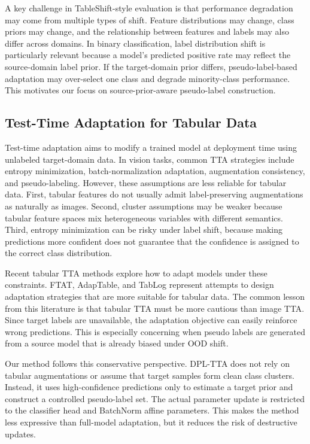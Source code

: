 A key challenge in TableShift-style evaluation is that performance degradation may come from multiple types of shift. Feature distributions may change, class priors may change, and the relationship between features and labels may also differ across domains. In binary classification, label distribution shift is particularly relevant because a model's predicted positive rate may reflect the source-domain label prior. If the target-domain prior differs, pseudo-label-based adaptation may over-select one class and degrade minority-class performance. This motivates our focus on source-prior-aware pseudo-label construction.

\subsection{Test-Time Adaptation for Tabular Data}

Test-time adaptation aims to modify a trained model at deployment time using unlabeled target-domain data. In vision tasks, common TTA strategies include entropy minimization, batch-normalization adaptation, augmentation consistency, and pseudo-labeling. However, these assumptions are less reliable for tabular data. First, tabular features do not usually admit label-preserving augmentations as naturally as images. Second, cluster assumptions may be weaker because tabular feature spaces mix heterogeneous variables with different semantics. Third, entropy minimization can be risky under label shift, because making predictions more confident does not guarantee that the confidence is assigned to the correct class distribution.

Recent tabular TTA methods explore how to adapt models under these constraints. FTAT, AdapTable, and TabLog represent attempts to design adaptation strategies that are more suitable for tabular data. The common lesson from this literature is that tabular TTA must be more cautious than image TTA. Since target labels are unavailable, the adaptation objective can easily reinforce wrong predictions. This is especially concerning when pseudo labels are generated from a source model that is already biased under OOD shift.

Our method follows this conservative perspective. DPL-TTA does not rely on tabular augmentations or assume that target samples form clean class clusters. Instead, it uses high-confidence predictions only to estimate a target prior and construct a controlled pseudo-label set. The actual parameter update is restricted to the classifier head and BatchNorm affine parameters. This makes the method less expressive than full-model adaptation, but it reduces the risk of destructive updates.


